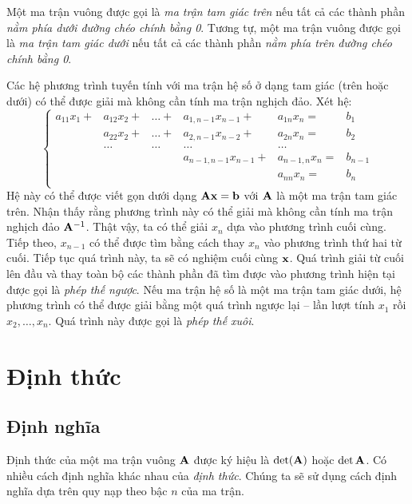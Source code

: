 Một ma trận vuông được gọi là \textit{ma trận tam giác trên} nếu tất cả các
thành phần \textit{nằm phía dưới đường chéo chính bằng 0}. Tương tự, một ma trận
vuông được gọi là \textit{ma trận tam giác dưới} nếu tất cả các thành phần
\textit{nằm phía trên đường chéo chính bằng 0}.


Các hệ phương trình tuyến tính với ma trận hệ số ở dạng tam giác (trên hoặc
dưới) có thể được giải mà không cần tính ma trận nghịch đảo. Xét hệ:
\begin{equation}
\left\{
\begin{matrix}
a_{11}x_1 + &a_{12}x_2 + &\dots + &a_{1,n-1}x_{n-1} + & a_{1n}x_n= & b_1 \\
&a_{22}x_2 + &\dots + &a_{2, n-1}x_{n-2} + &a_{2n}x_n = & b_2 \\
&\dots  & \dots & \dots    & \dots \\
& &    &a_{n-1,n-1}x_{n-1} + &a_{n-1, n}x_n = & b_{n-1} \\
& &    & &a_{nn}x_n = & b_{n} \\
\end{matrix}
\right.
\end{equation}
Hệ này có thể được viết gọn dưới dạng $\mathbf{A}\mathbf{x} = \mathbf{b}$ với $\mathbf{A}$ là một ma trận
tam giác trên. Nhận thấy rằng phương trình này có thể giải mà không cần tính ma
trận nghịch đảo $\mathbf{A}^{-1}$. Thật vậy, ta có thể giải $x_n$ dựa vào phương trình
cuối cùng. Tiếp theo, $x_{n-1}$ có thể được tìm bằng cách thay $x_n$ vào phương
trình thứ hai từ cuối. Tiếp tục quá trình này, ta sẽ có nghiệm cuối cùng $\mathbf{x}$.
Quá trình giải từ cuối lên đầu và thay toàn bộ các thành phần đã tìm được vào
phương trình
hiện tại được gọi là \textit{phép thế ngược}. Nếu ma trận hệ số là một ma
trận tam giác dưới, hệ phương trình có thể được giải bằng một quá trình ngược lại  --  lần lượt tính $x_1$ rồi $x_2, \dots, x_n$. Quá trình này được gọi là \textit{phép thế xuôi}.



\section{Định thức} %
\label{sec:dinh_thuc}
\subsection{Định nghĩa} %
\label{sub:dinh_nghia}

Định thức của một ma trận vuông $\mathbf{A}$ được ký hiệu là $\det(\mathbf{A})$ hoặc $\det
\mathbf{A}$. Có nhiều cách định nghĩa khác nhau của \textit{định thức}. Chúng ta sẽ sử
dụng cách định nghĩa dựa trên quy nạp theo bậc $n$ của ma trận.

